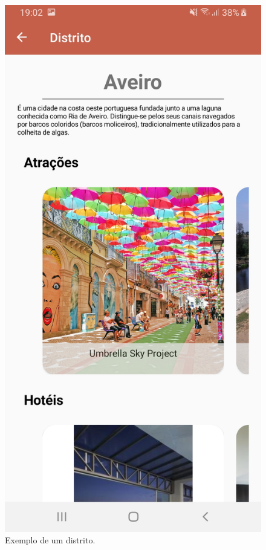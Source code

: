\begin{figure}[H]
\centering
\includegraphics[width=0.5\linewidth]{images/distritosEspecifico.jpg}
\caption{Exemplo de um distrito.}
\end{figure}